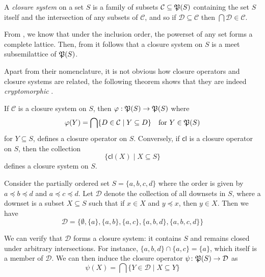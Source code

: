 \begin{definition}
	 \label{definition:closure-system}

	A \emph{closure system} on a set $S$ is a family of subsets $\mathcal{C}\subseteq \mathfrak{P}({S})$ containing the set $S$ itself
	and the intersection of any subsets of $\mathcal{C}$, and so if $\mathcal{D}\subseteq \mathcal{C}$ then
	$\bigcap \mathcal{D}\in \mathcal{C}$.
\end{definition}

From , we know that under the inclusion order, the powerset of any set forms a complete
lattice. Then, from  it follows that a closure system on $S$ is a meet subsemilattice of
$\mathfrak{P}({S})$.

Apart from their nomenclature, it is not obvious how closure operators and closure systems are related, the following
theorem shows that they are indeed \textit{cryptomorphic} \cite{CASPARD2003241}.

\begin{theorem}
	\label{theorem:relation-closure-operator-systems} If $\mathcal{C}$ is a closure system on $S$, then
	$\varphi : \mathfrak{P}({S})\to \mathfrak{P}({S})$ where
	\[
		\varphi(Y) = \bigcap \{D \in \mathcal{C}\mid Y \subseteq D\} \quad \text{for }Y \in \mathfrak{P}({S})
	\]
	for $Y \subseteq S$, defines a closure operator on $S$. Conversely, if $\mathsf{cl}$ is a closure operator on $S$,
	then the collection
	\[
		\{\mathsf{cl}(X) \mid X \subseteq S\}
	\]
	defines a closure system on $S$.
\end{theorem}

\begin{example}
	Consider the partially ordered set $S = \{a, b, c, d\}$ where the order is given by $a \preceq b \preceq d$ and $a \preceq
	c \preceq d$. Let $\mathcal{D}$ denote the collection of all downsets in $S$, where a downset is a subset $X \subseteq
	S$ such that if $x \in X$ and $y \preceq x$, then $y \in X$. Then we have
	\[
		\mathcal{D}= \big\{\emptyset, \{a\}, \{a,b\}, \{a,c\}, \{a,b,d\}, \{a,b,c ,d\}\big\}
	\]

	We can verify that $\mathcal{D}$ forms a closure system: it contains $S$ and remains closed under arbitrary intersections.
	For instance, $\{ a,b,d\} \cap \{ a,c\} = \{a\}$, which itself is a member of $\mathcal{D}$. We can then induce the closure
	operator $\psi \colon \mathfrak{P}({S})\to \mathcal{D}$ as
	\[
		\psi(X) = \bigcap \{Y \in \mathcal{D}\mid X \subseteq Y\}
	\]
\end{example}

